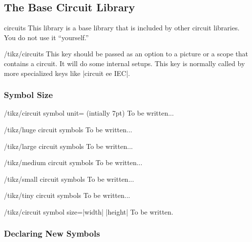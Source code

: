 \subsection{The Base Circuit Library}

\begin{tikzlibrary}{circuits}
  This library is a base library that is included by other circuit
  libraries. You do not use it ``yourself.''
\end{tikzlibrary}

\begin{key}{/tikz/circuits}
  This key should be passed as an option to a picture or a scope that
  contains a circuit. It will do some internal setups. This key is
  normally called by more specialized keys like |circuit ee IEC|.
\end{key}

\subsubsection{Symbol Size}

\begin{key}{/tikz/circuit symbol unit= (intially 7pt)}
  To be written...
\end{key}

\begin{stylekey}{/tikz/huge circuit symbols}
  To be written...
\end{stylekey}
\begin{stylekey}{/tikz/large circuit symbols}
  To be written...
\end{stylekey}
\begin{stylekey}{/tikz/medium circuit symbols}
  To be written...
\end{stylekey}
\begin{stylekey}{/tikz/small circuit symbols}
  To be written...
\end{stylekey}
\begin{stylekey}{/tikz/tiny circuit symbols}
  To be written...
\end{stylekey}

\begin{key}{/tikz/circuit symbol size=|width|  |height|
    } 
  To be written.
\end{key}

\subsubsection{Declaring New Symbols}

